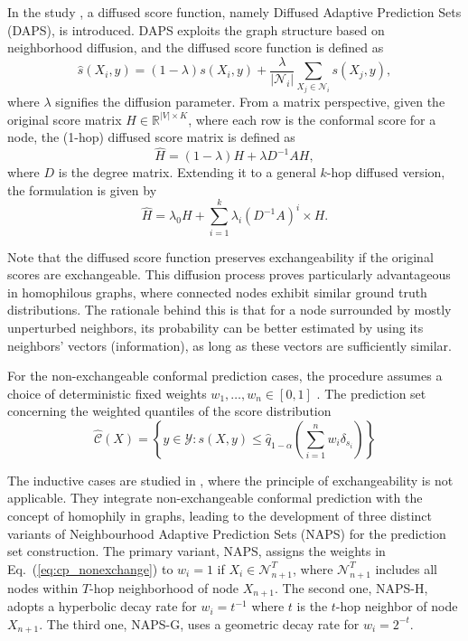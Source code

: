 In the study \cite{zargarbashi2023conformal},
a diffused score function, 
namely Diffused Adaptive Prediction Sets (DAPS), 
is introduced. 
DAPS exploits the graph structure based on neighborhood diffusion,
and the diffused score function is defined as
\begin{equation}
    \hat{s}(X_i,y)=(1-\lambda)s(X_i,y) + \frac{\lambda}{|\mathcal{N}_i|} \sum_{X_j\in\mathcal{N}_i} s(X_j, y),
\end{equation}
where $\lambda$ signifies the diffusion parameter. 
From a matrix perspective, 
given the original score matrix $H\in\mathbb{R}^{|V|\times K}$, 
where each row is the conformal score for a node, 
the (1-hop) diffused score matrix is defined as 
\begin{equation}
    \hat{H} = (1-\lambda)H + \lambda D^{-1}AH,
\end{equation}
where $D$ is the degree matrix.
Extending it to a general $k$-hop diffused version,
the formulation is given by 
\begin{equation}
    \hat{H}=\lambda_0 H + \sum_{i=1}^k \lambda_i(D^{-1}A)^i \times H.
\end{equation}

Note that the diffused score function preserves exchangeability if the original scores are exchangeable. 
This diffusion process proves particularly advantageous in homophilous graphs, 
where connected nodes exhibit similar ground truth distributions. 
% 
The rationale behind this is that for a node surrounded by mostly unperturbed neighbors, 
its probability can be better estimated by using its neighbors' vectors (information), as long as these vectors are sufficiently similar.

For the non-exchangeable conformal prediction cases,
the procedure assumes a choice of deterministic fixed weights $w_1,\dots,w_n \in [0,1]$ \cite{barber2023conformal}.
The prediction set concerning the weighted 
quantiles of the score distribution 
\begin{equation}
\label{eq:cp_nonexchange}
    \hat{\mathcal{C}}(X) = \left\{ y\in\mathcal{Y}: s(X,y)\leq  \hat{q}_{1-\alpha} \left( \sum_{i=1}^n w_i \delta_{s_i}
    \right) \right\}
\end{equation}

The inductive cases are studied in \cite{clarkson2023distribution},
where the principle of exchangeability is not applicable.
They integrate non-exchangeable conformal prediction with the concept of homophily in graphs, 
leading to the development of three distinct variants of Neighbourhood Adaptive Prediction Sets (NAPS) for the prediction set construction.
The primary variant, NAPS, assigns the weights in Eq.~(\ref{eq:cp_nonexchange}) to
$w_i=1$ if $X_i \in \mathcal{N}_{n+1}^T $, where $\mathcal{N}_{n+1}^T$ includes all nodes within $T$-hop neighborhood of node $X_{n+1}$. 
The second one, NAPS-H, adopts a hyperbolic decay rate for $w_i=t^{-1}$ where $t$ is the $t$-hop neighbor of node $X_{n+1}$.
The third one, NAPS-G, uses a geometric decay rate for $w_i=2^{-t}$.
